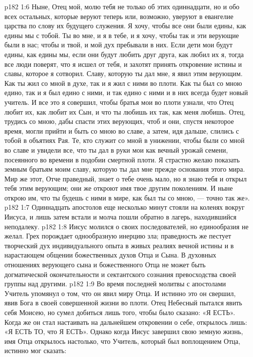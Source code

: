 \vs p182 1:6 Ныне, Отец мой, молю тебя не только об этих одиннадцати, но и обо всех остальных, которые веруют теперь или, возможно, уверуют в евангелие царства по слову их будущего служения. Я хочу, чтобы все они были едины, как едины мы с тобой. Ты во мне, и я в тебе, и я хочу, чтобы так и эти верующие были в нас; чтобы и твой, и мой дух пребывали в них. Если дети мои будут едины, как едины мы, если они будут любить друг друга, как любил их я, тогда все люди поверят, что я исшел от тебя, и захотят принять откровение истины и славы, которое я сотворил. Славу, которую ты дал мне, я явил этим верующим. Как ты жил со мной в духе, так и я жил с ними во плоти. Как ты был со мною едино, так и я был едино с ними, и так едино с ними и в них всегда будет новый учитель. И все это я совершил, чтобы братья мои во плоти узнали, что Отец любит их, как любит их Сын, и что ты любишь их так, как меня любишь. Отец, трудись со мною, дабы спасти этих верующих, чтоб и они, спустя некоторое время, могли прийти и быть со мною во славе, а затем, идя дальше, слились с тобой в объятиях Рая. Те, кто служит со мной в унижении, чтобы были со мной во славе и увидели все, что ты дал в руки мои как вечный урожай семени, посеянного во времени в подобии смертной плоти. Я страстно желаю показать земным братьям моим славу, которую ты дал мне прежде основания этого мира. Мир же этот, Отче праведный, знает о тебе очень мало, но я знаю тебя и открыл тебя этим верующим; они же откроют имя твое другим поколениям. И ныне открою им, что ты будешь с ними в мире, как был ты со мною, --- точно так же».
\vs p182 1:7 Одиннадцать апостолов еще несколько минут стояли на коленях вокруг Иисуса, и лишь затем встали и молча пошли обратно в лагерь, находившийся неподалеку.
\vs p182 1:8 \pc Иисус молился о  своих последователей, но единообразия не желал. Грех порождает однообразную инерцию зла; праведность же пестует творческий дух индивидуального опыта в живых реалиях вечной истины и в нарастающем общении божественных духов Отца и Сына. В духовных отношениях верующего сына и божественного Отца не может быть догматической окончательности и сектантского сознания превосходства своей группы над другими.
\vs p182 1:9 Во время последней молитвы с апостолами Учитель упомянул о том, что он явил миру  Отца. И истинно это он свершил, явив Бога в своей совершенной жизни во плоти. Отец Небесный пытался явить себя Моисею, но сумел добиться лишь того, чтобы было сказано: «Я ЕСТЬ». Когда же он стал настаивать на дальнейшем откровении о себе, открылось лишь: «Я ЕСТЬ ТО, что Я ЕСТЬ». Однако когда Иисус завершил свою земную жизнь, имя Отца открылось настолько, что Учитель, который был воплощением Отца, истинно мог сказать:
